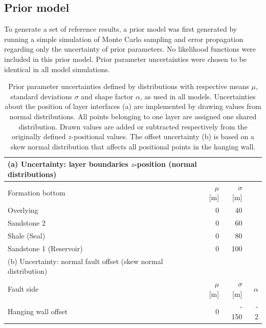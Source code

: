 		\subsection{Prior model}
		To generate a set of reference results, a prior model was first generated by running a simple simulation of Monte Carlo sampling and error propagation regarding only the uncertainty of prior parameters. No likelihood functions were included in this prior model. Prior parameter uncertainties were chosen to be identical in all model simulations.
		\begin{table}[h]
		\centering
		\begin{tabular}{lrrr} 
			\toprule
			(a) Uncertainty: layer boundaries $z$-position (normal distributions)\\  
			\midrule 
			Formation bottom & $\mu$ [m] & $\sigma$ [m]\\ 
			\midrule 
			Overlying & 0 & 40 \\
			Sandstone 2 & 0 & 60 \\
			Shale (Seal) & 0 & 80\\ 
			Sandstone 1 (Reservoir) & 0 & 100 \\
			\bottomrule
			\toprule
			(b) Uncertainty: normal fault offset (skew normal distribution)\\
			\midrule
			Fault side & $\mu$ [m] & $\sigma$ [m] & $\alpha$\\
			\midrule
			Hanging wall offset & 0 & -~150 & -~2\\
			\bottomrule 
		\end{tabular}
		\caption{Prior parameter uncertainties defined by distributions with respective means $\mu$, standard deviations $\sigma$ and shape factor $\alpha$, as used in all models. Uncertainties about the position of layer interfaces (a) are implemented by drawing values from normal distributions. All points belonging to one layer are assigned one shared distribution. Drawn values are added or subtracted respectively from the originally defined $z$-positional values. The offset uncertainty (b) is based on a skew normal distribution that affects all positional points in the hanging wall.}
		\label{tab:3D_prior_parameters}
		\end{table}
